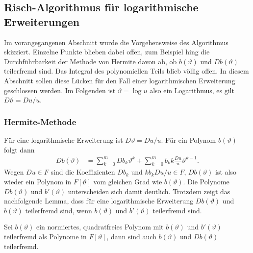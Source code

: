 %
%
\subsection{Risch-Algorithmus für logarithmische Erweiterungen
\label{buch:intalg:risch:logarithmisch}}
Im vorangegangenen Abschnitt wurde die Vorgehensweise des Algorithmus
skizziert.
Einzelne Punkte blieben dabei offen, zum Beispiel hing die Durchführbarkeit
der Methode von Hermite davon ab, ob $b(\vartheta)$ und $Db(\vartheta)$
teilerfremd sind.
Das Integral des polynomiellen Teils blieb völlig offen.
In diesem Abschnitt sollen diese Lücken für den Fall einer logarithmischen
Erweiterung geschlossen werden.
Im Folgenden ist $\vartheta=\log u$ also ein Logarithmus,
es gilt $D\vartheta = Du/u$.

%
%
\subsubsection{Hermite-Methode}
Für eine logarithmische Erweiterung ist $D\vartheta=Du/u$.
Für ein Polynom $b(\vartheta)$ folgt dann
\begin{align*}
Db(\vartheta)
&=
\sum_{k=0}^m
Db_k\vartheta^k
+
\sum_{k=0}^m
b_k k
\frac{Du}{u}
\vartheta^{k-1}.
\end{align*}
Wegen $Du\in F$ sind die Koeffizienten $Db_k$ und $kb_kDu/u\in F$,
$Db(\vartheta)$ ist also wieder ein Polynom in $F[\vartheta]$ vom
gleichen Grad wie $b(\vartheta)$.
Die Polynome $Db(\vartheta)$ und $b'(\vartheta)$ unterscheiden sich
damit deutlich.
Trotzdem zeigt das nachfolgende Lemma, dass für eine logarithmische 
Erweiterung $Db(\vartheta)$ und $b(\vartheta)$
teilerfremd sind, wenn $b(\vartheta)$ und $b'(\vartheta)$ teilerfremd sind.

\begin{lemma}
\label{buch:intalg:risch:log:lemma:bDb}
Sei $b(\vartheta)$ ein normiertes, quadratfreies Polynom mit
$b(\vartheta)$ und $b'(\vartheta)$ teilerfremd als Polynome in $F[\vartheta]$,
dann sind auch $b(\vartheta)$ und $Db(\vartheta)$ teilerfremd.
\end{lemma}

